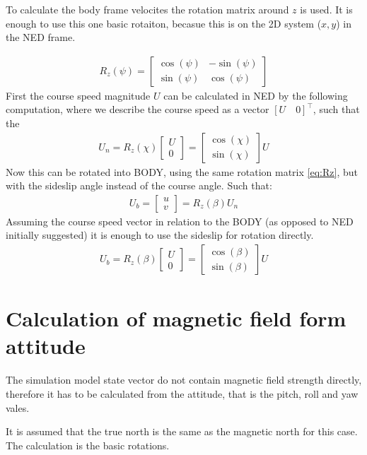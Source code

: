 To calculate the body frame velocites the rotation matrix around $z$ is used. It is enough to use this one basic rotaiton, becasue this is on the 2D system ($x,y$) in the \ac{NED} frame.

\begin{align}
R_{z} (\psi) =
\begin{bmatrix}
\cos(\psi) & -\sin(\psi)\\
\sin(\psi) & \cos(\psi)
\end{bmatrix}
\label{eq:Rz}
\end{align}
First the course speed magnitude $U$ can be calculated in \ac{NED} by the following computation, where we describe the course speed as a vector $[U\quad 0]^\top$, such that the 
\begin{align}
U_n = R_{z} (\chi)
\begin{bmatrix}
U \\ 0 
\end{bmatrix}
=
\begin{bmatrix}
\cos(\chi) \\
\sin(\chi)
\end{bmatrix}
U
\end{align}
Now this can be rotated into \ac{BODY}, using the same rotation matrix \vref{eq:Rz}, but with the sideslip angle instead of the course angle. Such that:
\begin{align}
U_b = \begin{bmatrix}
u \\ v
\end{bmatrix}
= R_z (\beta) U_n
\end{align}
Assuming the course speed vector in relation to the \ac{BODY} (as opposed to \ac{NED} initially suggested) it is enough to use the sideslip for rotation directly.
\begin{align}
U_b = R_{z} (\beta)
\begin{bmatrix}
U \\ 0 
\end{bmatrix}
=
\begin{bmatrix}
\cos(\beta) \\
\sin(\beta)
\end{bmatrix}
U
\end{align}


\section{Calculation of magnetic field form attitude}
The simulation model state vector do not contain magnetic field
strength directly, therefore it has to be calculated from the
attitude, that is the pitch, roll and yaw vales.

It is assumed that the true north is the same as the magnetic north
for this case. The calculation is the basic rotations.

